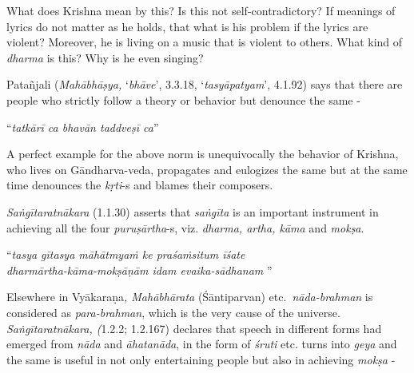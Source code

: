 What does Krishna mean by this? Is this not self-contradictory? If meanings of lyrics do not matter as he holds, that what is his problem if the lyrics are violent? Moreover, he is living on a music that is violent to others. What kind of \textit{dharma} is this? Why is he even singing?

Patañjali (\textit{Mahābhāṣya,} ‘\textit{bhāve}’, 3.3.18, ‘\textit{tasyāpatyam}’, 4.1.92) says that there are people who strictly follow a theory or behavior but denounce the same -

\begin{centerquote}
“\textit{tatkārī ca bhavān taddveṣī ca}”
\end{centerquote}

A perfect example for the above norm is unequivocally the behavior of Krishna, who lives on Gāndharva-veda, propagates and eulogizes the same but at the same time denounces the \textit{kṛti}-s and blames their composers. 

\textit{Saṅgītaratnākara} (1.1.30) asserts that \textit{saṅgīta} is an important instrument in achieving all the four \textit{puruṣārtha}-s, viz. \textit{dharma, artha, kāma} and \textit{mokṣa}.

\begin{longquote}
“\textit{tasya gītasya māhātmyaṁ ke praśaṁsitum īśate} \\ \textit{dharmārtha-kāma-mokṣāṇām idam evaika-sādhanam} ”
\end{longquote}

Elsewhere in Vyākaraṇa\textit{, Mahābhārata} (Śāntiparvan) etc.~\textit{nāda-brahman} is considered as \textit{para-brahman}, which is the very cause of the universe. \textit{Saṅgītaratnākara, (}1.2.2; 1.2.167) declares that speech in different forms had emerged from \textit{nāda} and \textit{āhatanāda}, in the form of \textit{śruti} etc. turns into \textit{geya} and the same is useful in not only entertaining people but also in achieving \textit{mokṣa} -

